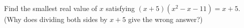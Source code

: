 Find the smallest real value of $x$ satisfying $(x+5)(x^2-x-11)=x+5$. (Why does dividing both sides by $x+5$ give the wrong answer?)
